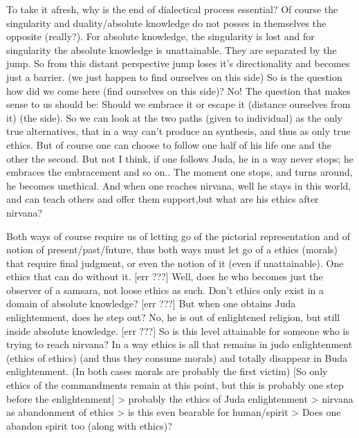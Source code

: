 \documentclass[10pt]{book}
\begin{document}
To take it afresh, why is the end of dialectical process essential?
Of course the singularity and duality/absolute knowledge do not posses in themselves the opposite (really?). For absolute knowledge, the singularity is lost and for singularity the absolute knowledge is unattainable. They are separated by the jump. So from this distant perspective jump loses it's directionality and becomes just a barrier. (we just happen to find ourselves on this side) So is the question how did we come here (find ourselves on this side)? No! The question that makes sense to us should be: Should we embrace it or escape it (distance ourselves from it) (the side). So we can look at the two paths (given to individual) as the only true alternatives, that in a way can't produce an synthesis, and thus as only true ethics. But of course one can choose to follow one half of his life one and the other the second. But not I think, if one follows Juda, he in a way never stops; he embraces the embracement and so on.. The moment one stops, and turns around, he becomes unethical.
And when one reaches nirvana, well he stays in this world, and can teach others and offer them support,but what are his ethics after nirvana?

Both ways of course require us of letting go of the pictorial representation and of notion of present/past/future, thus both ways must let go of a ethics (morals) that require final judgment, or even the notion of it (even if unattainable). One ethics that can do without it. [err ???] Well, does he who becomes just the observer of a samsara, not loose ethics as such. Don't ethics only exist in a domain of absolute knowledge? [err ???] But when one obtains Juda enlightenment, does he step out? No, he is out of enlightened religion, but still inside absolute knowledge. [err ???]
So is this level attainable for someone who is trying to reach nirvana?
In a way ethics is all that remains in judo enlightenment (ethics of ethics) (and thus they consume morals) and totally disappear in Buda enlightenment. (In both cases morals are probably the first victim) [So only ethics of the commandments remain at this point, but this is probably one step before the enlightenment] > probably the ethics of Juda enlightenment > nirvana as abandonment of ethics > is this even bearable for human/spirit > 
Does one abandon spirit too (along with ethics)?
\end{document}
